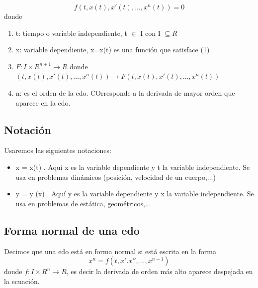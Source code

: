 \documentclass{book}
\begin{document}
    \begin{equation}
        f(t,x(t),x'(t),..., x^{n}(t))=0
    \end{equation}
    donde

    \begin{enumerate}
        \item t: tiempo o variable independiente, t $\in$ I con I $\subseteq  R$
        \item x: variable dependiente, x=x(t) es una función que satisface (1)
        \item $F: I \times R^{n+1} \rightarrow R$ donde\\ 
        $(t,x(t),x'(t),...,x^{n}(t)) \rightarrow  F(t,x(t),x'(t),...,x^{n}(t))$
        \item n: es el orden de la edo. COrresponde a la derivada de mayor orden que aparece 
        en la edo.
    \end{enumerate}

    \subsection{Notación}

    Usaremos las siguientes notaciones:

    \begin{itemize}
        \item x = x(t) . Aquí x es la variable dependiente y t la variable independiente.
        Se usa en problemas dinámicos (posición, velocidad de un cuerpo,...)
        \item y = y (x) . Aquí y es la variable dependiente y x la variable independiente.
        Se usa en problemas de estática, geométricos,...
    \end{itemize}

    \subsection{Forma normal de una edo}

    Decimos que una edo está en forma normal si está escrita en la forma
    \begin{equation*}
        x^{n}=f(t,x'.x'',...,x^{n-1})
    \end{equation*}
    donde $f:I \times R^{n} \rightarrow R$, es decir la derivada de orden más alto aparece
    despejada en la ecuación.
\end{document}
